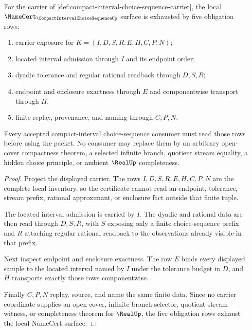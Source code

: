 \begin{theorem}
\label{thm:compact-interval-choice-sequence-namecert-obligations}
For the carrier of \autoref{def:compact-interval-choice-sequence-carrier}, the local $\NameCert_{\CompactIntervalChoiceSequenceUp}$ surface is exhausted by five obligation rows:
\begin{enumerate}
\item carrier exposure for $K=(I,D,S,R,E,H,C,P,N)$;
\item located interval admission through $I$ and its endpoint order;
\item dyadic tolerance and regular rational readback through $D,S,R$;
\item endpoint and enclosure exactness through $E$ and componentwise transport through $H$;
\item finite replay, provenance, and naming through $C,P,N$.
\end{enumerate}
Every accepted compact-interval choice-sequence consumer must read those rows before using the packet. No consumer may replace them by an arbitrary open-cover compactness theorem, a selected infinite branch, quotient stream equality, a hidden choice principle, or ambient $\RealUp$ completeness.
\end{theorem}
\begin{proof}
Project the displayed carrier. The rows $I,D,S,R,E,H,C,P,N$ are the complete local inventory, so the certificate cannot read an endpoint, tolerance, stream prefix, rational approximant, or enclosure fact outside that finite tuple.

The located interval admission is carried by $I$. The dyadic and rational data are then read through $D,S,R$, with $S$ exposing only a finite choice-sequence prefix and $R$ attaching regular rational readback to the observations already visible in that prefix.

Next inspect endpoint and enclosure exactness. The row $E$ binds every displayed sample to the located interval named by $I$ under the tolerance budget in $D$, and $H$ transports exactly those rows componentwise.

Finally $C,P,N$ replay, source, and name the same finite data. Since no carrier coordinate supplies an open cover, infinite branch selector, quotient stream witness, or completeness theorem for $\RealUp$, the five obligation rows exhaust the local NameCert surface.
\end{proof}

